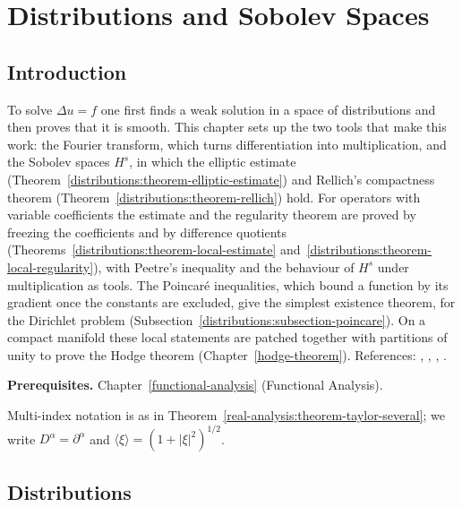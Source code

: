 \chapter{Distributions and Sobolev Spaces}\label{distributions}

\section{Introduction}\label{distributions:section-introduction}

To solve $\Delta u = f$ one first finds a weak solution in a space of distributions and then proves that it is smooth. This chapter
sets up the two tools that make this work: the Fourier transform, which turns differentiation into multiplication, and the Sobolev
spaces $H^s$, in which the elliptic estimate (Theorem~\ref{distributions:theorem-elliptic-estimate}) and Rellich's compactness
theorem (Theorem~\ref{distributions:theorem-rellich}) hold. For operators with variable coefficients the estimate and the regularity theorem are proved by freezing the coefficients and by difference
quotients (Theorems~\ref{distributions:theorem-local-estimate} and~\ref{distributions:theorem-local-regularity}), with Peetre's inequality and the behaviour of $H^s$ under multiplication as tools. The Poincar\'e inequalities, which bound a function by its gradient once the constants are
excluded, give the simplest existence theorem, for the Dirichlet problem (Subsection~\ref{distributions:subsection-poincare}). On a compact manifold these local statements are patched together with
partitions of unity to prove the Hodge theorem (Chapter~\ref{hodge-theorem}). References: \cite{hormander-pdo1},
\cite[Chapters 6--7]{rudin-fa}, \cite{brezis-functional}, \cite[Chapter 6]{warner-foundations}.

\noindent\textbf{Prerequisites.} Chapter~\ref{functional-analysis} (Functional Analysis).

Multi-index notation is as in Theorem~\ref{real-analysis:theorem-taylor-several}; we write $D^\alpha = \partial^\alpha$ and $\langle \xi \rangle = (1 + |\xi|^2)^{1/2}$.

\section{Distributions}\label{distributions:section-distributions}

